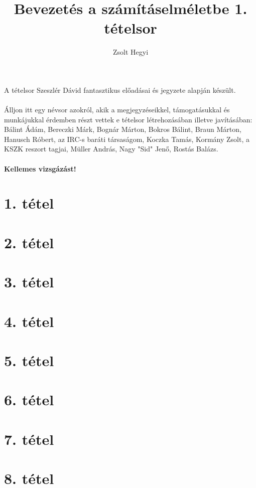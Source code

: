 \documentclass[]{article}
\title{Bevezetés a számításelméletbe 1. tételsor}
\author{Zsolt Hegyi}
\date{}
\begin{document}
\maketitle
\noindent A tételsor Szeszlér Dávid fantasztikus előadásai és jegyzete alapján készült.
\\
\\
\noindent Álljon itt egy névsor azokról, akik a megjegyzéseikkel, támogatásukkal és munkájukkal érdemben részt vettek e tételsor létrehozásában illetve javításában:
\\
\indent Bálint Ádám, Bereczki Márk, Bognár Márton, Bokros Bálint, Braun Márton, Hanusch Róbert, az IRC-s baráti társaságom, Koczka Tamás, Kormány Zsolt, a KSZK reszort tagjai, Müller András, Nagy "Sid" Jenő, Rostás Balázs.
\\
\\
\noindent \textbf{Kellemes vizsgázást!} %
\tableofcontents{}
\newpage
\section{1. tétel}

\newpage
\section{2. tétel}

\newpage
\section{3. tétel}

\newpage
\section{4. tétel}

\newpage
\section{5. tétel}

\newpage
\section{6. tétel}

\newpage
\section{7. tétel}

\newpage
\section{8. tétel}

\newpage
\end{document}
